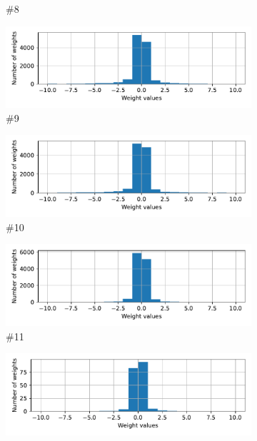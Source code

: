 \documentclass{article}
\begin{document}
\begin{figure}
\begin{subfigure}{0.48\linewidth}
        \caption{ \#8}
    \end{subfigure}
    \begin{subfigure}{0.48\linewidth}
        \centering
        \includegraphics[width=\linewidth]{hist_layer9}
        \caption{ \#9}
    \end{subfigure}
    \hfill
    \begin{subfigure}{0.48\linewidth}
        \centering
        \includegraphics[width=\linewidth]{hist_layer10}
        \caption{ \#10}
    \end{subfigure}
    \begin{subfigure}{0.48\linewidth}
        \centering
        \includegraphics[width=\linewidth]{hist_layer11}
        \caption{ \#11}
    \end{subfigure}
    \hfill
    \begin{subfigure}{0.48\linewidth}
        \centering
        \includegraphics[width=\linewidth]{hist_fc}

\end{subfigure}
\end{figure}
\end{document}
